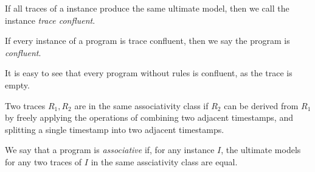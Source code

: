 %


\begin{definition}
%
If all traces of a \lang instance produce the same ultimate model, then we call
the instance {\em trace confluent}.
%
\end{definition}

\begin{definition}
%
If every instance of a program is trace confluent, then we say the program is
{\em confluent}.
%
\end{definition}

\noindent{}It is easy to see that every \lang program without 
rules is confluent, as the trace is empty.

\begin{definition}
%
Two traces $R_1, R_2$ are in the same associativity class if $R_2$ can be
derived from $R_1$ by freely applying the operations of combining two adjacent
timestamps, and splitting a single timestamp into two adjacent timestamps.
%
\end{definition}

\begin{definition}
%
We say that a \lang program is {\em associative} if, for any instance $I$,  the
ultimate models for any two traces of $I$ in the same assciativity class are
equal.
%
\end{definition}

